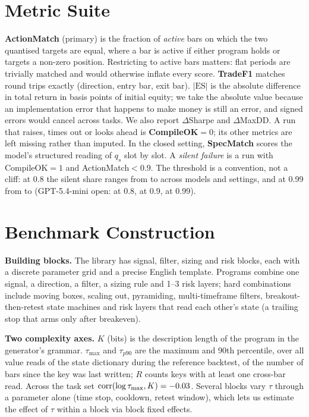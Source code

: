 \documentclass[sigconf,nonacm]{acmart}
\begin{document}
\section{Metric Suite}
\textbf{ActionMatch} (primary) is the fraction of \emph{active} bars on which the two quantised
targets are equal, where a bar is active if either program holds or targets a non-zero position.
Restricting to active bars matters: flat periods are trivially matched and would otherwise
inflate every score. \textbf{TradeF1} matches round trips exactly (direction, entry bar, exit bar).
$|\mathrm{ES}|$ is the absolute difference in total return in basis points of initial equity; we
take the absolute value because an implementation error that happens to make money is still an
error, and signed errors would cancel across tasks. We also report $\Delta$Sharpe and $\Delta$MaxDD.
A run that raises, times out or looks ahead is \textbf{CompileOK}$=0$; its other metrics are left
missing rather than imputed. In the closed setting, \textbf{SpecMatch} scores the model's
structured reading of $q_s$ slot by slot. A \emph{silent failure} is a run with CompileOK$=1$
and ActionMatch$<0.9$. The threshold is a convention, not a cliff: at 0.8 the silent share
ranges from \SilentEightyMin{} to \SilentEightyMax{} across models and settings, and at 0.99 from
\SilentNinetyNineMin{} to \SilentNinetyNineMax{} (GPT-5.4-mini open: \SilentGptOpenEighty{} at 0.8,
\SilentGptOpen{} at 0.9, \SilentGptOpenNinetyNine{} at 0.99).

\section{Benchmark Construction}
\textbf{Building blocks.} The library has \NBlocksSignal{} signal, \NBlocksFilter{} filter,
\NBlocksSizing{} sizing and \NBlocksRisk{} risk blocks, each
with a discrete parameter grid and a precise English template. Programs combine one signal,
a direction, a filter, a sizing rule and 1--3 risk layers; hard combinations include moving
boxes, scaling out, pyramiding, multi-timeframe filters, breakout-then-retest state machines and
risk layers that read each other's state (a trailing stop that arms only after breakeven).

\textbf{Two complexity axes.} $K$ (bits) is the description length of the program in the
generator's grammar. $\tau_{\max}$ and $\tau_{p90}$ are the maximum and 90th percentile, over all
value reads of the state dictionary during the reference backtest, of the number of bars since
the key was last written; $R$ counts keys with at least one cross-bar read. Across the task set
$\mathrm{corr}(\log\tau_{\max},K)=-0.03$. Several blocks vary $\tau$ through a parameter
alone (time stop, cooldown, retest window), which lets us estimate the effect of $\tau$ within a
block via block fixed effects.
\end{document}
